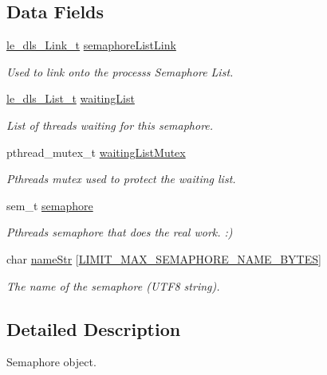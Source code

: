\subsection*{Data Fields}
\begin{DoxyCompactItemize}
\item 
\hyperlink{structle__dls___link__t}{le\+\_\+dls\+\_\+\+Link\+\_\+t} \hyperlink{struct_semaphore__t_afb3944f86c4cca8dca30f0093e955f8f}{semaphore\+List\+Link}
\begin{DoxyCompactList}\small\item\em Used to link onto the process\textquotesingle{}s Semaphore List. \end{DoxyCompactList}\item 
\hyperlink{structle__dls___list__t}{le\+\_\+dls\+\_\+\+List\+\_\+t} \hyperlink{struct_semaphore__t_afddf45c7c1b831ceaea6dfcabe7da0ac}{waiting\+List}
\begin{DoxyCompactList}\small\item\em List of threads waiting for this semaphore. \end{DoxyCompactList}\item 
pthread\+\_\+mutex\+\_\+t \hyperlink{struct_semaphore__t_adb1a443e625146f5b426817db14af607}{waiting\+List\+Mutex}
\begin{DoxyCompactList}\small\item\em Pthreads mutex used to protect the waiting list. \end{DoxyCompactList}\item 
sem\+\_\+t \hyperlink{struct_semaphore__t_abb6744de577a9c7a4cc3c354552ed899}{semaphore}
\begin{DoxyCompactList}\small\item\em Pthreads semaphore that does the real work. \+:) \end{DoxyCompactList}\item 
char \hyperlink{struct_semaphore__t_aa80e31b44e94b0280c955b725a873741}{name\+Str} \mbox{[}\hyperlink{limit_8h_a0127b4050ef0672e37f72568f37fbd75}{L\+I\+M\+I\+T\+\_\+\+M\+A\+X\+\_\+\+S\+E\+M\+A\+P\+H\+O\+R\+E\+\_\+\+N\+A\+M\+E\+\_\+\+B\+Y\+T\+ES}\mbox{]}
\begin{DoxyCompactList}\small\item\em The name of the semaphore (U\+T\+F8 string). \end{DoxyCompactList}\end{DoxyCompactItemize}


\subsection{Detailed Description}
Semaphore object. 

